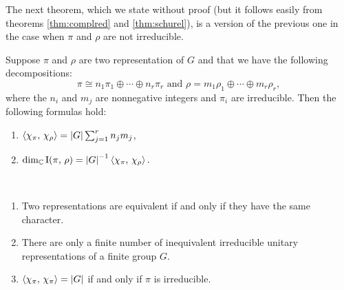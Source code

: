The next theorem, which we state without proof (but it follows easily from theorems \ref{thm:complred} and \ref{thm:schurel}), is a version of the previous one in the case when $\pi$ and $\rho$ are not irreducible.
\begin{theorem}
\label{thm:non_irreducible_rel}
Suppose $\pi$ and $\rho$ are two representation of $G$ and that we have the following decompositions:
\[
\pi\cong n_1\pi_1\oplus\cdots \oplus n_r\pi_r\text{ and $\rho=m_1\rho_1\oplus\cdots \oplus m_r\rho_r,$}
\]
where the $n_i$ and $m_j$ are nonnegative integers and $\pi_i$ are irreducible. Then the following formulas hold:
\begin{enumerate}
\item $\braket{\chi_\pi,\, \chi_\rho}=\lvert G\rvert \sum_{j=1}^rn_jm_j$,
\item $ \dim_{\mathbb C}\operatorname{I}(\pi, \, \rho)={\lvert G\rvert}^{-1}\braket{\chi_\pi,\, \chi_\rho}.$
\end{enumerate}
\end{theorem}
\begin{cor}~ 
\begin{enumerate}
\item Two representations are equivalent if and only if they have the same character.
\item There are only a finite number of inequivalent irreducible unitary representations of a finite group $G$.
\item $\braket{\chi_\pi,\, \chi_\pi}=\lvert G\rvert$ if and only if $\pi$ is irreducible.
\end{enumerate}
\end{cor}
